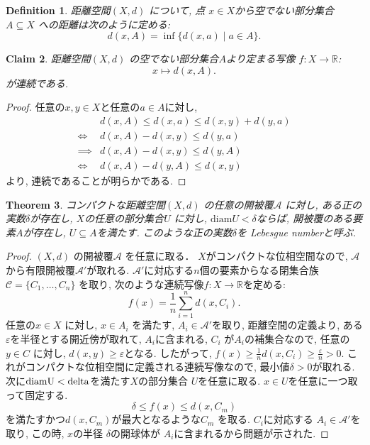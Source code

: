 \documentclass[lualatex]{ltjsbook}
\newtheorem{theorem}{Theorem}[chapter]
\newtheorem{definition}[theorem]{Definition}
\newtheorem{claim}[theorem]{Claim}
\theoremstyle{remark}
\theoremstyle{plain}
\begin{document}
\begin{definition}
	距離空間$\left( X , d \right) $ について,  点 $x \in  X$から空でない部分集合 $  A \subseteq X$ への距離は次のように定める:
	\[
	d\left( x, A \right) = \inf  \{d\left( x, a \right)  \mid a \in A\} 
	.\] 
\end{definition}

\begin{claim}
	距離空間$\left( X , d \right) $ の空でない部分集合$A$より定まる写像 $f: X \to \mathbb{R}$:
	\[
	x \mapsto d(x, A)
	.\] 
が連続である.
\end{claim}

\begin{proof}
	任意の$x, y \in X$と任意の$a \in A$に対し,  
	\[
	\begin{aligned}
		& d\left( x, A \right)   \le d(x, a) \le d(x, y) + d(y, a)\\
		\iff &d(x, A) - d(x, y)  \le d(y, a) \\
		\implies &d(x, A) -d(x, y) \le d(y, A)\\
		\iff & d(x, A) -d(y, A) \le d(x, y)
	\end{aligned}
	\] 
	より,  連続であることが明らかである.
\end{proof}


\begin{theorem}
	コンパクトな距離空間$\left( X, d \right) $ の任意の開被覆$\mathcal{A}$ に対し,  
	ある正の実数$\delta$が存在し,  $X$の任意の部分集合$U$ に対し,  $\mathrm{diam}U < \delta$ならば,  開被覆のある要素$A$が存在し,  $U \subseteq A$を満たす.
	このような正の実数$\delta$を Lebesgue numberと呼ぶ.
\end{theorem}

\begin{proof}
	$\left( X, d \right) $ の開被覆$\mathcal{A}$ を任意に取る．
	$X$がコンパクトな位相空間なので,   $\mathcal{A}$ から有限開被覆$\mathcal{A}'$が取れる. $\mathcal{A}'$に対応する$n$個の要素からなる閉集合族$\mathcal{C} = \{C_1,  \ldots ,  C_{n}\} $ を取り,  次のような連続写像$f: X \to \mathbb{R}$を定める:
	\[
		f(x) = \frac{1}{n}\sum_{i =1}^n d(x, C_i)
	.\]
	任意の$x \in X $ に対し,  
	$x \in A_i$ を満たす,  $A_i \in \mathcal{A}'$を取り,  
	距離空間の定義より,  ある$\varepsilon$を半径とする開近傍が取れて, 
	$A_i$に含まれる, 
	$C_i$ が$A_i$の補集合なので,  
	任意の $y \in C$ に対し,   $d(x, y) \ge \varepsilon$となる. 
	したがって,  
	$f(x) \ge \frac{1}{n}d(x, C_i) \ge \frac{\varepsilon}{n}>0$.
	これがコンパクトな位相空間に定義される連続写像なので,   最小値$\delta >0$が取れる.
	次に$\rm{diam}U<delta$を満たす$X$の部分集合 $U$を任意に取る.  $x \in U$を任意に一つ取って固定する.
	 $$\delta \le f(x) \le d(x, C_m)$$
	  を満たすかつ$d(x, C_m)$が最大となるような$C_m$ を取る.
	  $C_i$に対応する $A_i \in \mathcal{A}'$を取り,  この時,  $x$の半径 $\delta$の開球体が $A_i$に含まれるから問題が示された.
\end{proof}
\end{document}
